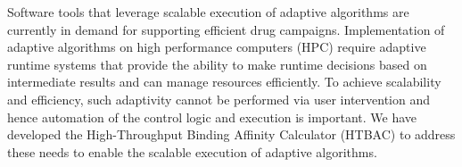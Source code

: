 

 


Software tools that leverage scalable execution of adaptive algorithms are
currently in demand for supporting efficient drug campaigns. Implementation
of adaptive algorithms on high performance computers (HPC) require adaptive
runtime systems that provide the ability to make runtime decisions based on
intermediate results and can manage resources efficiently. To achieve
scalability and efficiency, such adaptivity cannot be performed via user
intervention and hence automation of the control logic and execution is
important. We have developed the High-Throughput Binding Affinity Calculator
(HTBAC) to address these needs to enable the scalable execution of adaptive
algorithms.


